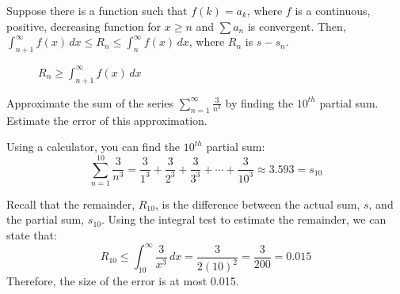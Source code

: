 Suppose there is a function such that $f(k) = a_k$, where $f$ is a continuous, 
positive, decreasing function for $x \geq n$ and $\sum a_n$ is convergent. 
Then, $\int_{n+1}^\infty f(x)\,dx \leq R_n \leq \int_n^\infty f(x)\,dx$, where 
$R_n$ is $s - s_n$. 

\begin{figure}[H]
    \centering
    \caption{$R_n \geq \int_{n+1}^\infty f(x)\,dx$ }
    \label{fig:remainderfloor}
\end{figure}

\begin{Worked}
\begin{Problem}
Approximate the sum of the series $\sum_{n=1}^\infty 
\frac{3}{n^3}$ by finding the $10^{th}$ partial sum. Estimate the error of 
this approximation. 
\end{Problem}
\begin{Solution}
Using a calculator, you can find the $10^{th}$ partial sum: 
$$\sum_{n=1}^{10} \frac{3}{n^3} = \frac{3}{1^3} + \frac{3}{2^3} + 
\frac{3}{3^3} + \cdots + \frac{3}{10^3} \approx 3.593 = s_{10}$$

Recall that the remainder, $R_{10}$, is the difference between the actual sum, 
$s$, and the partial sum, $s_{10}$. Using the integral test to estimate the 
remainder, we can state that: $$R_{10} \leq \int_{10}^\infty \frac{3}{x^3}\,dx 
= \frac{3}{2(10)^2} = \frac{3}{200} = 0.015$$ Therefore, the size of the error 
is at most 0.015. 
\end{Solution}
\end{Worked}

